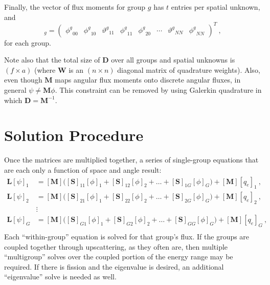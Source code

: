\documentclass[12pt]{article}
\newcommand{\ve}[1]{\ensuremath{\mathbf{#1}}}
\newcommand{\even}{\ensuremath{\phi^g}}
\newcommand{\odd}{\ensuremath{\vartheta^g}}
\begin{document}
Finally, the
vector of flux moments for group $g$ has $t$ entries per spatial unknown, and
%
\begin{equation} 
[\phi]_g = \begin{pmatrix} \even_{00} & \even_{10} & \odd_{11}
& \even_{11} & \even_{20} & \cdots & \odd_{NN} & \even_{NN}
  \end{pmatrix}^T\:,
\end{equation} for each group.

Note also that the total size of $\ve{D}$ over all
groups and spatial unknowns is $(f\times a)$ (where $\ve{W}$ is an $(n\times n)$ diagonal matrix of quadrature
weights).  Also, even though $\ve{M}$ maps
angular flux moments onto discrete angular fluxes, in general
$\psi\ne\ve{M}\phi$.  This constraint can be removed by using Galerkin
quadrature in which $\ve{D} = \ve{M}^{-1}$.


\section*{Solution Procedure}
Once the matrices are multiplied together, a series of single-group equations that are each only a function of space and angle result:
%
\begin{equation}
  \begin{aligned}
    \ve{L}[\psi]_1 &= [\ve{M}]\bigl([\ve{S}]_{11}[\phi]_1 + 
    [\ve{S}]_{12}[\phi]_2 + \ldots + [\ve{S}]_{1G}[\phi]_G\bigr) + 
    [\ve{M}][q_{e}]_1\:, \\
    \ve{L}[\psi]_2 &= [\ve{M}]\bigl([\ve{S}]_{21}[\phi]_1 + 
    [\ve{S}]_{22}[\phi]_2 + \ldots + [\ve{S}]_{2G}[\phi]_G\bigr) + 
    [\ve{M}][q_{e}]_2\:, \\
    &\vdots\\
    \ve{L}[\psi]_G &= [\ve{M}]\bigl([\ve{S}]_{G1}[\phi]_1 + 
    [\ve{S}]_{G2}[\phi]_2 + \ldots + [\ve{S}]_{GG}[\phi]_G\bigr) + 
       [\ve{M}][q_{e}]_G\:, \\
  \end{aligned}
  \label{eq:group-equations}
\end{equation}
%
Each ``within-group'' equation is solved for that group's flux. If the groups are coupled together through upscattering, as they often are, then multiple ``multigroup'' solves over the coupled portion of the energy range may be required. If there is fission and the eigenvalue is desired, an additional ``eigenvalue'' solve is needed as well. 
\end{document}
